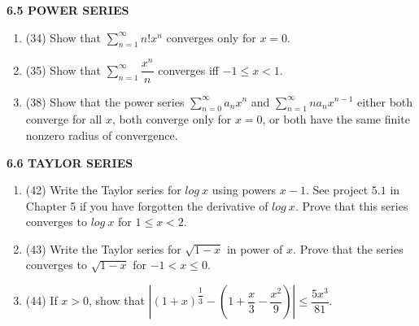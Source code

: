 \documentclass[fleqn]{article}
\begin{document}
  \textbf{6.5 POWER SERIES}
  \begin{enumerate}
    \item (34) Show that $\sum\limits_{n=1}^{\infty} n! x^n$ converges only for $x=0$.


    \item (35) Show that $\sum\limits_{n=1}^{\infty} \dfrac{x^n}{n}$ converges iff $-1 \leq x <1$.


    \item (38) Show that the power series $\sum\limits_{n=0}^{\infty} a_n x^n$ and $\sum\limits_{n=1}^{\infty} n a_n x^{n-1}$ either both converge for all 
    $x$, both converge only for $x=0$, or both have the same finite nonzero radius of convergence.

  \end{enumerate}


  \textbf{6.6 TAYLOR SERIES}
  \begin{enumerate}
    \item (42) Write the Taylor series for $log ~ x$ using powers $x-1$. See project $5.1$ in Chapter 5 if
    you have forgotten the derivative of $log ~ x$. Prove that this series converges to $log ~ x$ for $1 \leq x <2$.

    \item (43) Write the Taylor series for $\sqrt{1-x}$ in power of $x$. Prove that the series converges to $\sqrt{1-x}$ for
    $-1 < x \leq 0$.

    \item (44) If $x > 0$, show that $|\left(1+x\right)^{\dfrac{1}{3}}-\left(1+\dfrac{x}{3}-\dfrac{x^2}{9}\right)| \leq \dfrac{5x^3}{81}$.

  \end{enumerate}
\end{document}
